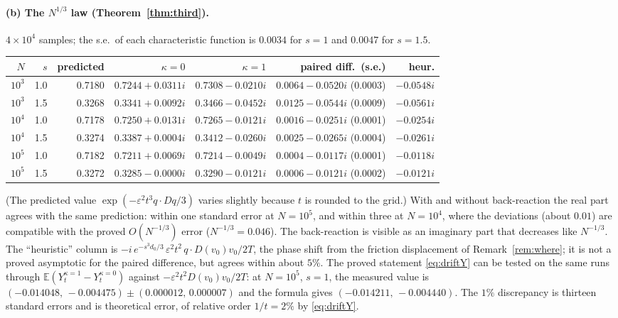 \documentclass[11pt]{article}
\newcommand{\E}{\mathbb{E}}
\newcommand{\eps}{\varepsilon}
\theoremstyle{remark}
\begin{document}
\paragraph{(b) The $N^{1/3}$ law (Theorem~\ref{thm:third}).}
$4\times10^4$ samples; the s.e.\ of each characteristic function is $0.0034$
for $s=1$ and $0.0047$ for $s=1.5$.
\begin{center}\small\setlength{\tabcolsep}{4pt}
\begin{tabular}{rr|r|rr|rr}
  $N$ & $s$ & predicted & $\kappa=0$ & $\kappa=1$ & paired diff.\ (s.e.) & heur. \\ \hline
  $10^3$ & 1.0 & 0.7180 & $0.7244+0.0311i$ & $0.7308-0.0210i$ & $0.0064-0.0520i$ (0.0003) & $-0.0548i$ \\
  $10^3$ & 1.5 & 0.3268 & $0.3341+0.0092i$ & $0.3466-0.0452i$ & $0.0125-0.0544i$ (0.0009) & $-0.0561i$ \\
  $10^4$ & 1.0 & 0.7178 & $0.7250+0.0131i$ & $0.7265-0.0121i$ & $0.0016-0.0251i$ (0.0001) & $-0.0254i$ \\
  $10^4$ & 1.5 & 0.3274 & $0.3387+0.0004i$ & $0.3412-0.0260i$ & $0.0025-0.0265i$ (0.0004) & $-0.0261i$ \\
  $10^5$ & 1.0 & 0.7182 & $0.7211+0.0069i$ & $0.7214-0.0049i$ & $0.0004-0.0117i$ (0.0001) & $-0.0118i$ \\
  $10^5$ & 1.5 & 0.3272 & $0.3285-0.0000i$ & $0.3290-0.0121i$ & $0.0006-0.0121i$ (0.0002) & $-0.0121i$ \\
\end{tabular}
\end{center}
(The predicted value $\exp(-\eps^2t^3q\cdot Dq/3)$ varies slightly because
$t$ is rounded to the grid.) With and without back-reaction the real part
agrees with the same prediction: within one standard error at $N=10^5$,
and within three at $N=10^4$, where the deviations (about $0.01$) are
compatible with the proved $O(N^{-1/3})$ error ($N^{-1/3}=0.046$). The back-reaction is visible as an
imaginary part that decreases like $N^{-1/3}$. The ``heuristic'' column is
$-i\,e^{-s^3d_0/3}\,\eps^2t^2\,q\cdot D(v_0)v_0/2T$, the phase shift from
the friction displacement of Remark~\ref{rem:where}; it is not a proved
asymptotic for the paired difference, but agrees within about $5\%$. The
proved statement \eqref{eq:driftY} can be tested on the same runs through
$\E(Y^{\kappa=1}_t-Y^{\kappa=0}_t)$ against $-\eps^2t^2D(v_0)v_0/2T$: at
$N=10^5$, $s=1$, the measured value is
$(-0.014048,\,-0.004475)\pm(0.000012,\,0.000007)$ and the formula gives
$(-0.014211,\,-0.004440)$. The $1\%$ discrepancy is thirteen standard
errors and is theoretical error, of relative order $1/t=2\%$ by
\eqref{eq:driftY}.
\end{document}
